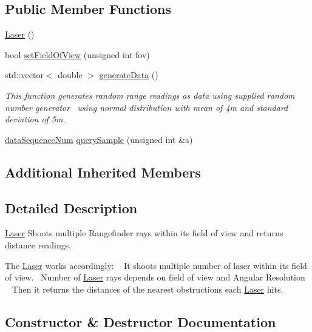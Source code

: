 \subsection*{Public Member Functions}
\begin{DoxyCompactItemize}
\item 
\hyperlink{class_laser_a68465e89283dffcc29a37e94693c6f87}{Laser} ()
\item 
bool \hyperlink{class_laser_a5f140784aae7e82c2aa0f690548d6ebb}{set\+Field\+Of\+View} (unsigned int fov)
\item 
std\+::vector$<$ double $>$ \hyperlink{class_laser_af2d93a5e123f3b637be6d3383019562b}{generate\+Data} ()
\begin{DoxyCompactList}\small\item\em This function generates random range readings as data using supplied random number generator~\newline
using normal distribution with mean of 4m and standard deviation of 5m. \end{DoxyCompactList}\item 
\hyperlink{struct_ranger_1_1data_sequence_num}{data\+Sequence\+Num} \hyperlink{class_laser_a35d376014dcf81c217e8bbe1bfd34926}{query\+Sample} (unsigned int \&a)
\end{DoxyCompactItemize}
\subsection*{Additional Inherited Members}


\subsection{Detailed Description}
\hyperlink{class_laser}{Laser} Shoots multiple Rangefinder rays within its field of view and returns distance readings. 

The \hyperlink{class_laser}{Laser} works accordingly\+: ~\newline
It shoots multiple number of laser within its field of view.~\newline
Number of \hyperlink{class_laser}{Laser} rays depends on field of view and Angular Resolution ~\newline
Then it returns the distances of the nearest obstructions each \hyperlink{class_laser}{Laser} hits.~\newline
 

\subsection{Constructor \& Destructor Documentation}
